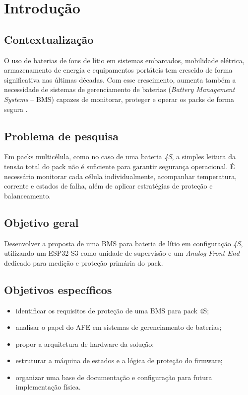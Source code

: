 \chapter{Introdução}

\section{Contextualização}

O uso de baterias de íons de lítio em sistemas embarcados, mobilidade elétrica, armazenamento
de energia e equipamentos portáteis tem crescido de forma significativa nas últimas décadas.
Com esse crescimento, aumenta também a necessidade de sistemas de gerenciamento de baterias
(\textit{Battery Management Systems} -- BMS) capazes de monitorar, proteger e operar os packs
de forma segura \cite{andrea2010,plett2015v1}.

\section{Problema de pesquisa}

Em packs multicélula, como no caso de uma bateria \textit{4S}, a simples leitura da tensão total
do pack não é suficiente para garantir segurança operacional. É necessário monitorar cada célula
individualmente, acompanhar temperatura, corrente e estados de falha, além de aplicar estratégias
de proteção e balanceamento.

\section{Objetivo geral}

Desenvolver a proposta de uma BMS para bateria de lítio em configuração \textit{4S}, utilizando
um ESP32-S3 como unidade de supervisão e um \textit{Analog Front End} dedicado para medição e
proteção primária do pack.

\section{Objetivos específicos}

\begin{itemize}
  \item identificar os requisitos de proteção de uma BMS para pack 4S;
  \item analisar o papel do AFE em sistemas de gerenciamento de baterias;
  \item propor a arquitetura de hardware da solução;
  \item estruturar a máquina de estados e a lógica de proteção do firmware;
  \item organizar uma base de documentação e configuração para futura implementação física.
\end{itemize}

